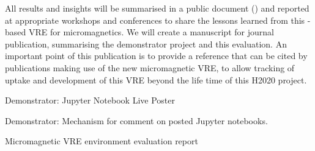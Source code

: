 \begin{workpackage}[id=social-aspects,wphases=0-48,
  title=Social Aspects,
  lead=UO,
  UORM=27,USHRM=8, USORM=6]
\begin{tasklist}
\begin{task}[title=Evaluation of Micromagnetic VRE,lead=USO,PM=6,id=oommf-nb-evaluation]
  All results and insights will be summarised in a public document
  () and reported at appropriate
  workshops and conferences to share the lessons learned from this
  \Jupyter-based VRE for micromagnetics. We will create a manuscript
  for journal publication, summarising the demonstrator project and
  this evaluation. An important point of this publication is to
  provide a reference that can be cited by publications making use of
  the new micromagnetic VRE, to allow tracking of uptake and
  development of this VRE beyond the life time of this H2020 project.
\end{task}



\end{tasklist}


\begin{wpdelivs}
 \begin{wpdeliv}[due=36,id=social-poster,dissem=PU,nature=DEM,lead=USH]
   {Demonstrator: Jupyter Notebook Live Poster} 
\end{wpdeliv}
 \begin{wpdeliv}[due=24,id=social-poster,dissem=PU,nature=DEM,lead=USH]
   {Demonstrator: Mechanism for comment on posted Jupyter notebooks.} 
\end{wpdeliv}
 \begin{wpdeliv}[due=48,id=oommf-nb-evaluation,dissem=PU,nature=R,lead=USO]
      {Micromagnetic VRE environment evaluation report}
\end{wpdeliv}
\end{wpdelivs}
\end{workpackage}

